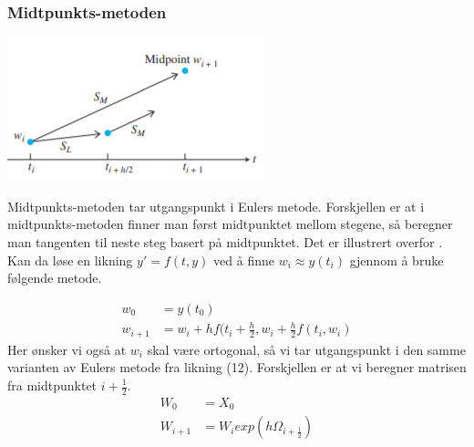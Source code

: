 \subsubsection{Midtpunkts-metoden}
\begin{center}
    \includegraphics{rapport/teori/bilder/midpoint.PNG}
\end{center}
Midtpunkts-metoden tar utgangspunkt i Eulers metode. Forskjellen er at i midtpunkts-metoden finner man først midtpunktet mellom stegene, så beregner man tangenten til neste steg basert på midtpunktet. Det er illustrert overfor \cite{MATEMATIKK:1}.\newline\newline
Kan da løse en likning $y' = f(t, y)$ ved å finne $w_i \approx y(t_i)$ gjennom å bruke følgende metode.

\begin{equation}
\begin{aligned}
    w_0&=y(t_0)\\
    w_{i+1}&=w_i + hf(t_i+\frac{h}{2}, w_i+\frac{h}{2}f(t_i, w_i)
\end{aligned}
\end{equation}
Her ønsker vi også at $w_i$ skal være ortogonal, så vi tar utgangspunkt i den samme varianten av Eulers metode fra likning (12). Forskjellen er at vi beregner matrisen fra midtpunktet $i+\frac{1}{2}$.
\begin{equation}
\begin{aligned}
    W_0&=X_0\\
    W_{i+1}&=W_iexp(h\Omega_{i+\frac{1}{2}})
\end{aligned}
\end{equation}


